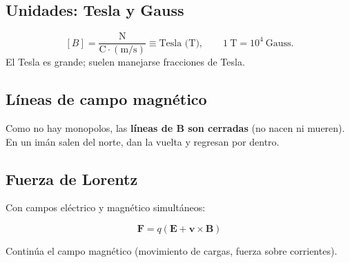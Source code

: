 \documentclass[12pt,a4paper]{article}
\begin{document}
\subsection{Unidades: Tesla y Gauss}

\[
[B] = \frac{\text{N}}{\text{C}\cdot(\text{m/s})} \equiv \text{Tesla (T)},
\qquad 1\ \text{T} = 10^{4}\ \text{Gauss}.
\]
El Tesla es grande; suelen manejarse fracciones de Tesla.

\subsection{Líneas de campo magnético}

Como no hay monopolos, las \textbf{líneas de $\mathbf{B}$ son cerradas}
(no nacen ni mueren). En un imán salen del norte, dan la vuelta y
regresan por dentro.

\subsection{Fuerza de Lorentz}

Con campos eléctrico y magnético simultáneos:

\begin{keybox}
  \[
  \boxed{\mathbf{F} = q\left(\mathbf{E} + \mathbf{v}\times\mathbf{B}\right)}
  \]
\end{keybox}

\begin{notebox}
  Continúa el campo magnético (movimiento de cargas, fuerza sobre
  corrientes).
\end{notebox}
\end{document}
